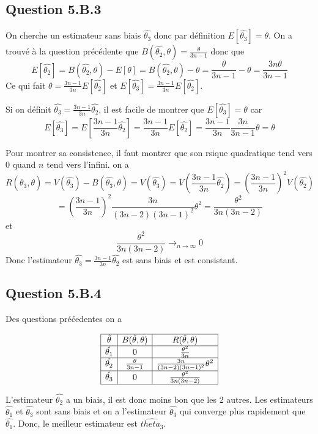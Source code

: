 \documentclass[]{book}
\theoremstyle{definition}
\begin{document}
\subsection*{Question 5.B.3}
On cherche un estimateur sans biais $\hat{\theta_3}$ donc par d\'efinition $E[\hat{\theta_3}] = \theta$. On a trouv\'e \`a la question pr\'ec\'edente que $B(\hat{\theta_2},\theta) = \frac{\theta}{3n-1}$ donc que 
$$
E[\hat{\theta_2}] = B(\hat{\theta_2},\theta) - E[\theta] = B(\hat{\theta_2},\theta) - \theta = \frac{\theta}{3n-1} - \theta = \frac{3n\theta}{3n-1}
$$
Ce qui fait $\theta = \frac{3n-1}{3n}E[\hat{\theta_2}]$ et $E[\hat{\theta_3}] = \frac{3n-1}{3n}E[\hat{\theta_2}]$.

Si on d\'efinit $\hat{\theta_3} = \frac{3n-1}{3n}\hat{\theta_2}$, il est facile de montrer que $E[\hat{\theta_3}] = \theta$ car 
$$
E[\hat{\theta_3}] = E\left[\frac{3n-1}{3n}\hat{\theta_2}\right] = \frac{3n-1}{3n}E[\hat{\theta_2}] = \frac{3n-1}{3n} \frac{3n}{3n-1} \theta = \theta
$$

Pour montrer sa consistence, il faut montrer que son rsique quadratique tend vers 0 quand $n$ tend vers l'infini. on a 
$$
R(\hat{\theta_3},\theta) = V(\hat{\theta_3}) - B(\hat{\theta_3},\theta) = V(\hat{\theta_3}) = V\left(\frac{3n-1}{3n}\hat{\theta_2}\right) = \left(\frac{3n-1}{3n}\right)^2V(\hat{\theta_2})
$$
$$
= \left(\frac{3n-1}{3n}\right)^2\frac{3n}{(3n-2)(3n-1)^2}\theta^2 = \frac{\theta^2}{3n(3n-2)}
$$
et
$$
\frac{\theta^2}{3n(3n-2)} \to_{n \to \infty} 0
$$
Donc l'estimateur $\hat{\theta_3} = \frac{3n-1}{3n}\hat{\theta_2}$ est sans biais et est consistant.


\subsection*{Question 5.B.4}
Des questions pr\'e\'cedentes on a 

$$
\begin{array}{|c|c|c|}
    \hline
    \hat{\theta} & B(\hat{\theta},\theta) & R(\hat{\theta},\theta) \\
    \hline
    \hat{\theta_1} & 0 & \frac{\theta^2}{3n} \\
    \hline
    \hat{\theta_2} &  \frac{\theta}{3n-1} & \frac{3n}{(3n-2)(3n-1)^2}\theta^2 \\
    \hline
    \hat{\theta_3} & 0 & \frac{\theta^2}{3n(3n-2)} \\
    \hline
\end{array}
$$



L'estimateur $\hat{\theta_2}$ a un biais, il est donc moins bon que les 2 autres. Les estimateurs $\hat{\theta_1}$ et  $\hat{\theta_3}$ sont sans biais et on a l'estimateur $\hat{\theta_3}$ qui converge plus rapidement que $\hat{\theta_1}$. Donc, le meilleur estimateur est $\hat{theta_3}$.
\end{document}
